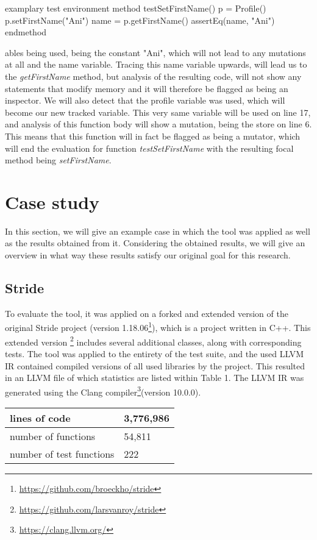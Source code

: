 \documentclass[11pt]{article}
\begin{document}
\begin{multicols}{2}
\begin{sexylisting}{examplary test environment\label{lst:example1}}
method testSetFirstName()
  p = Profile()
  p.setFirstName("Ani")
  name = p.getFirstName()
  assertEq(name, "Ani")
endmethod
\end{sexylisting}

\noindent
ables being used, being the constant "Ani", which will not lead to any mutations at all and the name variable. Tracing this name variable upwards, will lead us to the \textit{getFirstName} method, but analysis of the resulting code, will not show any statements that modify memory and it will therefore be flagged as being an inspector. We will also detect that the profile variable was used, which will become our new tracked variable. This very same variable will be used on line 17, and analysis of this function body will show a mutation, being the store on line 6. This means that this function will in fact be flagged as being a mutator, which will end the evaluation for function \textit{testSetFirstName} with the resulting focal method being \textit{setFirstName}.

\section{Case study}
In this section, we will give an example case in which the tool was applied as well as the results obtained from it. Considering the obtained results, we will give an overview in what way these results satisfy our original goal for this research.

\subsection{Stride}
To evaluate the tool, it was applied on a forked and extended version of the original Stride project (version 1.18.06\footnote{\url{https://github.com/broeckho/stride}}), which is a project written in C++. This extended version \footnote{\url{https://github.com/larsvanroy/stride}} includes several additional classes, along with corresponding tests. The tool was applied to the entirety of the test suite, and the used LLVM IR contained compiled versions of all used libraries by the project. This resulted in an LLVM file of which statistics are listed within Table 1. The LLVM IR was generated using the Clang compiler\footnote{\url{https://clang.llvm.org/}}(version 10.0.0).

\begin{center}
	\begin{tabular}{ |p{4.5cm}|p{2.5cm}|  }
		\hline
		lines of code & 3,776,986\\
		\hline
		number of functions   & 54,811\\
		\hline
		number of test functions &   222\\
		\hline
	\end{tabular}
\end{center}


\end{multicols}
\end{document}
